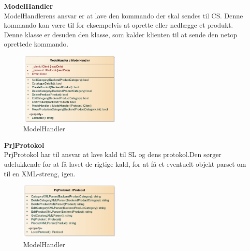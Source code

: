  
 


\textbf{ModelHandler}\\
ModelHandlerens ansvar er at lave den kommando der skal sendes til \gls{CS}. Denne kommando kan være til for eksempelvis at oprette eller nedlægge et produkt. Denne klasse er desuden den klasse, som kalder klienten til at sende den netop oprettede kommando. 
\begin{center}
\begin{figure}[!h]
    \centering
    \includegraphics[width=0.45\textwidth]{Systemdesign/backend/klassebeskrivelser/Images/ModelHandler.png}
    \caption{ModelHandler}
    \label{fig:modelhandlerreal}
\end{figure}
\end{center}
\label{Modelhandler_Beskrivelse}
 \bigskip
 
 
 
 
 

\textbf{PrjProtokol}\\
PrjProtokol har til ansvar at lave kald til \gls{SL} og dens protokol.Den sørger udelukkende for at få lavet de rigtige kald, for at få et eventuelt objekt parset om til en XML-streng, igen. \bigskip
\begin{center}
\begin{figure}[!h]
    \centering
    \includegraphics[width=0.45\textwidth]{Systemdesign/backend/klassebeskrivelser/Images/PrjProtokol.png}
    \caption{ModelHandler}
    \label{fig:prjprotko}
\end{figure}
\end{center}
\label{PrjProtokol_Beskrivelse}
 \bigskip
 




